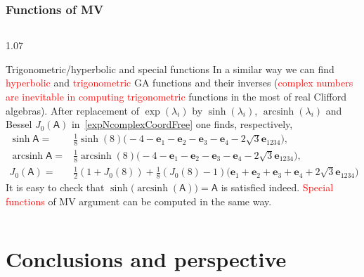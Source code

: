 \documentclass[xcolor=table,hyperref={pdfpagemode=FullScreen}]{beamer}
\DeclareMathOperator{\arcsinh}{arcsinh}
\newcommand{\e}[1]{\mathbf{e}_{#1}} %
\def\m#1{\mathsf{#1}} %
\def\m#1{\mathsf{#1}}%
\newcommand{\red}[1]{\textcolor{red}{#1}}
\begin{document}
\begin{frame}
\frametitle<presentation>{Functions of MV}
\vskip -15pt
\begin{columns}[t]
\begin{column}{1.07\textwidth}
  \begin{block}{Trigonometric/hyperbolic and special functions} 
    In a similar way we can find \red{hyperbolic} and \red{trigonometric}
   GA  functions and their inverses (\red{complex
    numbers are inevitable in computing trigonometric} functions in the
    most of real Clifford algebras). After replacement of 
$\exp(\lambda_i)$ by  $\sinh(\lambda_i)$, $\arcsinh(\lambda_i)$ and Bessel $J_0(\m{A})$
in~\eqref{expNcomplexCoordFree} one finds, respectively,
\begin{equation*}
\begin{split}
  \sinh{\m{A}}=&\frac{1}{8}\sinh(8)\bigl(-4-\e{1}- \e{2}-\e{3}-\e{4}-2 \sqrt{3} \e{1234}\bigr),\\
  \arcsinh{\m{A}}=&\frac{1}{8}\arcsinh(8)\bigl(-4 -\e{1} - \e{2}-\e{3}-\e{4} -2 \sqrt{3} \e{1234} \bigr),\\
  J_0(\m{A})=& \frac{1}{2} (1+J_0(8))+
 \frac{1}{8} (J_0(8)-1) \bigl(\e{1}+\e{2}+\e{3}+\e{4}+2\sqrt{3} \e{1234} \bigr)
\end{split}
\end{equation*}
It is easy to check that $\sinh\bigl(\arcsinh(\m{A})\bigr)=\m{A}$
    is  satisfied indeed. \red{Special functions} of MV argument  can be computed in the same way.
 \end{block}
\end{column}
\end{columns}
\end{frame}



\section[Conclusions and perspective]{Conclusions and perspective}
\end{document}
